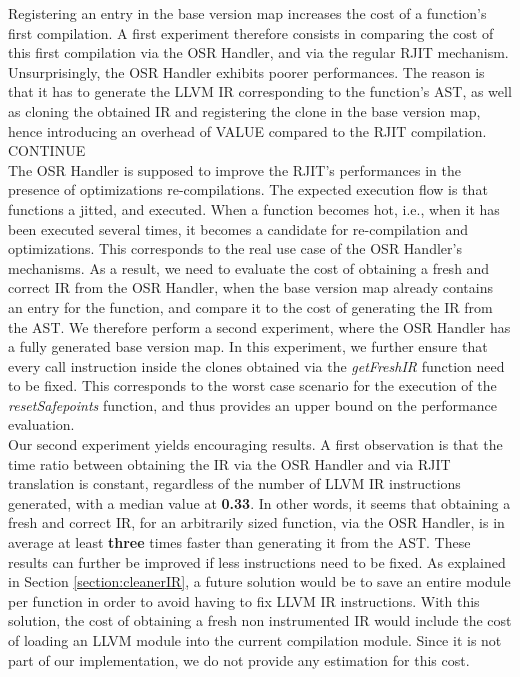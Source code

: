Registering an entry in the base version map increases the cost of a function's first compilation.
A first experiment therefore consists in comparing the cost of this first compilation via the OSR Handler, and via the regular RJIT mechanism. 
Unsurprisingly, the OSR Handler exhibits poorer performances. 
The reason is that it has to generate the LLVM IR corresponding to the function's AST, as well as cloning the obtained IR and registering the clone in the base version map, hence introducing an overhead of VALUE compared to the RJIT compilation.
CONTINUE\\


The OSR Handler is supposed to improve the RJIT's performances in the presence of optimizations re-compilations.
The expected execution flow is that functions a jitted, and executed. 
When a function becomes hot, i.e., when it has been executed several times, it becomes a candidate for re-compilation and optimizations.
This corresponds to the real use case of the OSR Handler's mechanisms.
As a result, we need to evaluate the cost of obtaining a fresh and correct IR from the OSR Handler, when the base version map already contains an entry for the function, and compare it to the cost of generating the IR from the AST.
We therefore perform a second experiment, where the OSR Handler has a fully generated base version map.
In this experiment, we further ensure that every call instruction inside the clones obtained via the \textit{getFreshIR} function need to be fixed.
This corresponds to the worst case scenario for the execution of the \textit{resetSafepoints} function, and thus provides an upper bound on the performance evaluation.\\

Our second experiment yields encouraging results.
A first observation is that the time ratio between obtaining the IR via the OSR Handler and via RJIT translation is constant, regardless of the number of LLVM IR instructions generated, with a median value at \textbf{0.33}. 
In other words, it seems that obtaining a fresh and correct IR, for an arbitrarily sized function, via the OSR Handler, is in average at least \textbf{three} times faster than generating it from the AST.
These results can further be improved if less instructions need to be fixed.
As explained in Section \ref{section:cleanerIR}, a future solution would be to save an entire module per function in order to avoid having to fix LLVM IR instructions.
With this solution, the cost of obtaining a fresh non instrumented IR would include the cost of loading an LLVM module into the current compilation module. 
Since it is not part of our implementation, we do not provide any estimation for this cost.\\

